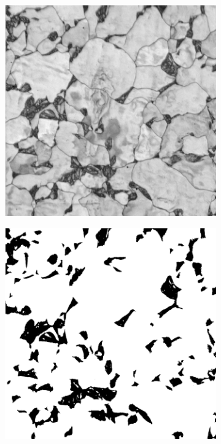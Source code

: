\documentclass{article}
\begin{document}
\begin{figure}[h!]
     \centering
     \begin{subfigure}[b]{0.3\textwidth}
         \centering
         \includegraphics[width=\textwidth]{Micro1_500.png}
         \caption{}
         \label{fig:Micro1_500}
     \end{subfigure}
     \hfill
     \begin{subfigure}[b]{0.3\textwidth}
         \centering
         \includegraphics[width=\textwidth]{Micro2_500.png}

\end{subfigure}
\end{figure}
\end{document}
